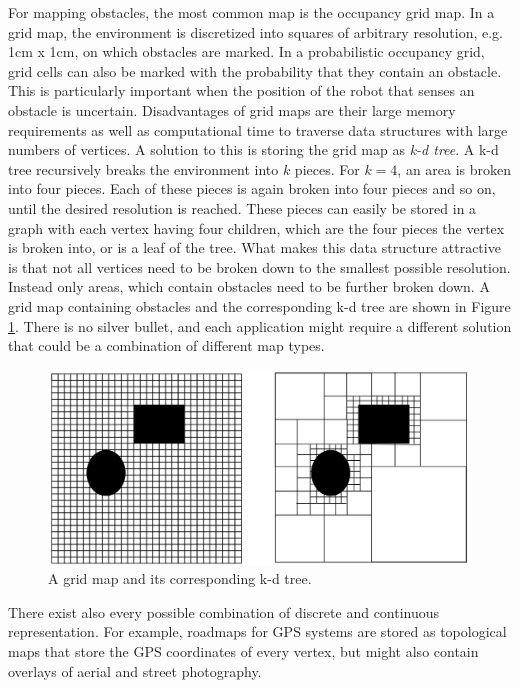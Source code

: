 For mapping obstacles, the most common map is the occupancy grid map. In a grid map, the environment is discretized into squares of arbitrary resolution, e.g. 1cm x 1cm, on which obstacles are marked. In a probabilistic occupancy grid, grid cells can also be marked with the probability that they contain an obstacle. This is particularly important when the position of the robot that senses an obstacle is uncertain. Disadvantages of grid maps are their large memory requirements as well as computational time to traverse data structures with large numbers of vertices. A solution to this is storing the grid map as \emph{k-d tree}. A k-d tree recursively breaks the environment into $k$ pieces. For $k=4$, an area is broken into four pieces. Each of these pieces is again broken into four pieces and so on, until the desired resolution is reached. These pieces can easily be stored in a graph with each vertex having four children, which are the four pieces the vertex is broken into, or is a leaf of the tree. What makes this data structure attractive is that not all vertices need to be broken down to the smallest possible resolution. Instead only areas, which contain obstacles need to be further broken down. A grid map containing obstacles and the corresponding k-d tree are shown in Figure \ref{fig:gridvskdtree}. There is no silver bullet, and each application might require a different solution that could be a combination of different map types.

\begin{figure}
\centering
\includegraphics[width=\textwidth]{figs/gridvskdtree.png}
\caption{A grid map and its corresponding k-d tree.\label{fig:gridvskdtree}}
\end{figure}


There exist also every possible combination of discrete and continuous representation. For example, roadmaps for GPS systems are stored as topological maps that store the GPS coordinates of every vertex, but might also contain overlays of aerial and street photography.

